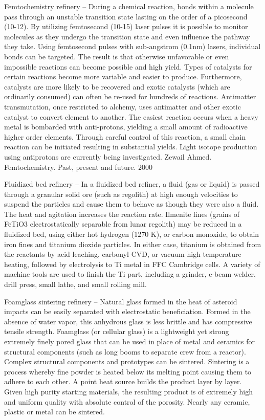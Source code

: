 \documentclass[a4paper]{book}
\begin{document}
Femtochemistry refinery – During a chemical reaction, bonds within a molecule pass through an unstable transition state lasting on the order of a picosecond (10-12).  By utilizing femtosecond (10-15) laser pulses it is possible to monitor molecules as they undergo the transition state and even influence the pathway they take.  Using femtosecond pulses with sub-angstrom (0.1nm) lasers, individual bonds can be targeted. The result is that otherwise unfavorable or even impossible reactions can become possible and high yield.  Types of catalysts for certain reactions become more variable and easier to produce.  Furthermore, catalysts are more likely to be recovered and exotic catalysts (which are ordinarily consumed) can often be re-used for hundreds of reactions.  Antimatter transmutation, once restricted to alchemy, uses antimatter and other exotic catalyst to convert element to another.  The easiest reaction occurs when a heavy metal is bombarded with anti-protons, yielding a small amount of radioactive higher order elements.  Through careful control of this reaction, a small chain reaction can be initiated resulting in substantial yields.  Light isotope production using antiprotons are currently being investigated.
Zewail Ahmed. Femtochemistry. Past, present and future. 2000
 
Fluidized bed refinery – In a fluidized bed refiner, a fluid (gas or liquid) is passed through a granular solid ore (such as regolith) at high enough velocities to suspend the particles and cause them to behave as though they were also a fluid. The heat and agitation increases the reaction rate. Ilmenite fines (grains of FeTiO3 electrostatically separable from lunar regolith) may be reduced in a fluidized bed, using either hot hydrogen (1270 K), or carbon monoxide, to obtain iron fines and titanium dioxide particles. In either case, titanium is obtained from the reactants by acid leaching, carbonyl CVD, or vacuum high temperature heating, followed by electrolysis to Ti metal in FFC Cambridge cells. A variety of machine tools are used to finish the Ti part, including a grinder, e-beam welder, drill press, small lathe, and small rolling mill. 
 
Foamglass sintering refinery – Natural glass formed in the heat of asteroid impacts can be easily separated with electrostatic beneficiation.  Formed in the absence of water vapor, this anhydrous glass is less brittle and has compressive tensile strength.  Foamglass (or cellular glass) is a lightweight yet strong extremely finely pored glass that can be used in place of metal and ceramics for structural components (such as long booms to separate crew from a reactor).  Complex structural components and prototypes can be sintered.  Sintering is a process whereby fine powder is heated below its melting point causing them to adhere to each other.  A point heat source builds the product layer by layer.  Given high purity starting materials, the resulting product is of extremely high and uniform quality with absolute control of the porosity.  Nearly any ceramic, plastic or metal can be sintered.
 
\end{document}
